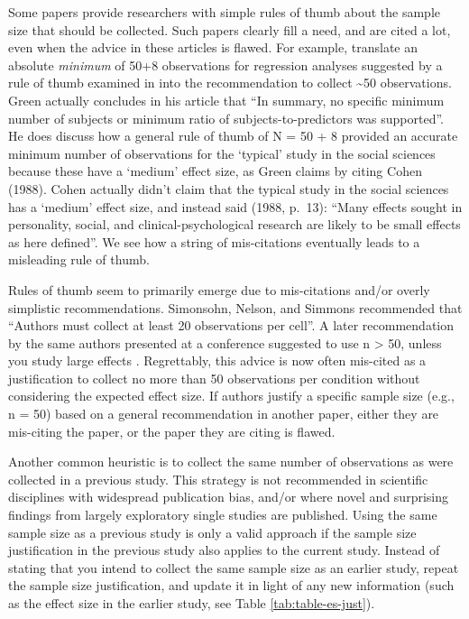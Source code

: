 \documentclass[
]{krantz}
\begin{document}
Some papers provide researchers with simple rules of thumb about the sample size that should be collected. Such papers clearly fill a need, and are cited a lot, even when the advice in these articles is flawed. For example, \citet{wilson_vanvoorhis_understanding_2007} translate an absolute \emph{minimum} of 50+8 observations for regression analyses suggested by a rule of thumb examined in \citet{green_how_1991} into the recommendation to collect \textasciitilde50 observations. Green actually concludes in his article that ``In summary, no specific minimum number of subjects or minimum ratio of subjects-to-predictors was supported''. He does discuss how a general rule of thumb of N = 50 + 8 provided an accurate minimum number of observations for the `typical' study in the social sciences because these have a `medium' effect size, as Green claims by citing Cohen (1988). Cohen actually didn't claim that the typical study in the social sciences has a `medium' effect size, and instead said (1988, p.~13): ``Many effects sought in personality, social, and clinical-psychological research are likely to be small effects as here defined''. We see how a string of mis-citations eventually leads to a misleading rule of thumb.

Rules of thumb seem to primarily emerge due to mis-citations and/or overly simplistic recommendations. Simonsohn, Nelson, and Simmons \citeyearpar{simmons_false-positive_2011} recommended that ``Authors must collect at least 20 observations per cell''. A later recommendation by the same authors presented at a conference suggested to use n \textgreater{} 50, unless you study large effects \citep{simmons_life_2013}. Regrettably, this advice is now often mis-cited as a justification to collect no more than 50 observations per condition without considering the expected effect size. If authors justify a specific sample size (e.g., n = 50) based on a general recommendation in another paper, either they are mis-citing the paper, or the paper they are citing is flawed.

Another common heuristic is to collect the same number of observations as were collected in a previous study. This strategy is not recommended in scientific disciplines with widespread publication bias, and/or where novel and surprising findings from largely exploratory single studies are published. Using the same sample size as a previous study is only a valid approach if the sample size justification in the previous study also applies to the current study. Instead of stating that you intend to collect the same sample size as an earlier study, repeat the sample size justification, and update it in light of any new information (such as the effect size in the earlier study, see Table \ref{tab:table-es-just}).
\end{document}
